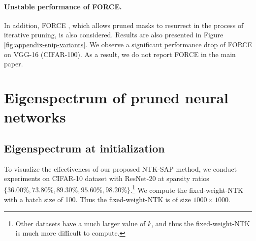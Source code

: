 \documentclass{article} %
\begin{document}
\paragraph{Unstable performance of FORCE.}In addition, FORCE \citep{force}, which allows pruned masks to resurrect in the process of iterative pruning, is also considered. Results are also presented in Figure \ref{fig:appendix-snip-variants}. We observe a significant performance drop of FORCE on VGG-16 (CIFAR-100). As a result, we do not report FORCE in the main paper.

\section{Eigenspectrum of pruned neural networks} \label{sect:all-eigen}

\subsection{Eigenspectrum at initialization}
\label{sect:appendix-eigen-init}
To visualize the effectiveness of our proposed NTK-SAP method, we conduct experiments on CIFAR-10 dataset with ResNet-20 at sparsity ratios $\{36.00\%, 73.80\%, 89.30\%, 95.60\%, 98.20\%\}$.\footnote{Other datasets have a much larger value of $k$, and thus the fixed-weight-NTK is much more difficult to compute.} We compute the fixed-weight-NTK with a batch size of 100. Thus the fixed-weight-NTK is of size $1000 \times 1000$.
\end{document}
